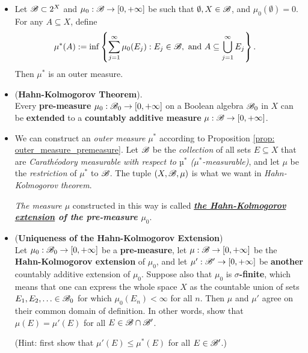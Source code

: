 \documentclass[11pt]{article}
\begin{document}
\begin{itemize}
\item \begin{proposition} \label{prop: outer_measure_premeasure}
Let ${\mathscr B} \subset 2^X$ and $\mu_0: {\mathscr B} \rightarrow [0, +\infty]$ be such that $\emptyset, X \in {\mathscr B}$, and $\mu_0(\emptyset) = 0$. For any $A \subseteq X$, define 
\begin{align*}
\mu^{*}(A) &:= \inf\left\{\sum_{j=1}^{\infty}\mu_0(E_j): E_j \in {\mathscr B}, \text{ and } A \subseteq \bigcup_{j=1}^{\infty}E_j\right\}. 
\end{align*} Then $\mu^{*}$ is an outer measure. 
\end{proposition}

\item \begin{theorem} (\textbf{Hahn-Kolmogorov Theorem}).\\
Every \textbf{pre-measure} $\mu_0 : {\mathscr B}_0 \rightarrow [0, +\infty]$  on a Boolean algebra ${\mathscr B}_{0}$ in $X$ can be \textbf{extended} to a \textbf{countably additive measure} $\mu : {\mathscr B} \rightarrow [0, +\infty]$.
\end{theorem}

\item \begin{remark}
We can construct an \emph{outer measure} $\mu^{*}$ according to Proposition \ref{prop: outer_measure_premeasure}. Let ${\mathscr B}$ be the \emph{collection} of all sets $E \subseteq X$ that are \textit{Carath\'eodory measurable with respect to $µ^{*}$ ($\mu^{*}$-measurable)}, and let $\mu$ be the \emph{restriction} of $\mu^{*}$  to ${\mathscr B}$. The tuple $(X, {\mathscr B}, \mu)$ is what we want in \emph{Hahn-Kolmogorov theorem}. 

\emph{The measure $\mu$} constructed in this way is called \emph{\textbf{ \underline{the Hahn-Kolmogorov extension} of the pre-measure $\mu_0$}}. 
\end{remark}

\item \begin{proposition} (\textbf{Uniqueness of the Hahn-Kolmogorov Extension})\\
Let $\mu_0 : {\mathscr B}_0 \rightarrow [0, +\infty]$ be a \textbf{pre-measure}, let $\mu : {\mathscr B} \rightarrow [0, +\infty]$ be the \textbf{Hahn-Kolmogorov extension} of $\mu_0$, and let $\mu' : {\mathscr B}' \rightarrow  [0, +\infty]$ be \textbf{another} countably additive extension of $\mu_0$. Suppose also that $\mu_0$ is \textbf{$\sigma$-finite}, which means that one can express the whole space $X$ as the countable union of sets $E_1, E_2, \ldots \in {\mathscr B}_{0}$ for which $\mu_0(E_n) < \infty$ for all $n$. Then $\mu$ and $\mu'$ agree on their common domain of definition. In other words, show that  $\mu(E) = \mu'(E)$ for all $E \in {\mathscr B} \cap {\mathscr B}'$.
\end{proposition} (Hint: first show that $\mu'(E) \le \mu^{*}(E)$ for all $E \in {\mathscr B}'$.)


\end{itemize}
\end{document}

